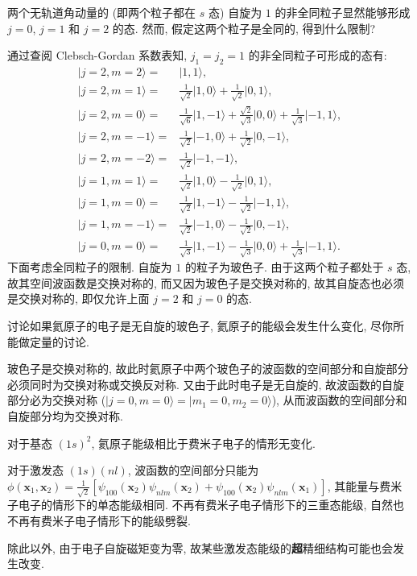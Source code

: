 \documentclass{assignment}
\begin{document}
\begin{prob}[课本习题 7.3]
    两个无轨道角动量的 (即两个粒子都在 $s$ 态) 自旋为 $1$ 的非全同粒子显然能够形成 $j=0$, $j=1$ 和 $j=2$ 的态. 然而, 假定这两个粒子是全同的, 得到什么限制?
\end{prob}
\begin{pf}
    通过查阅 Clebsch-Gordan 系数表知, $j_1=j_2=1$ 的非全同粒子可形成的态有:
    \begin{align}
        \lvert j=2,m=2\rangle=&\lvert 1,1\rangle,\\
        \lvert j=2,m=1\rangle=&\frac{1}{\sqrt{2}}\lvert 1,0\rangle+\frac{1}{\sqrt{2}}\lvert 0,1\rangle,\\
        \lvert j=2,m=0\rangle=&\frac{1}{\sqrt{6}}\lvert 1,-1\rangle+\frac{\sqrt{2}}{\sqrt{3}}\lvert 0,0\rangle+\frac{1}{\sqrt{3}}\lvert-1,1\rangle,\\
        \lvert j=2,m=-1\rangle=&\frac{1}{\sqrt{2}}\lvert-1,0\rangle+\frac{1}{\sqrt{2}}\lvert 0,-1\rangle,\\
        \lvert j=2,m=-2\rangle=&\frac{1}{\sqrt{2}}\lvert-1,-1\rangle,\\
        \lvert j=1,m=1\rangle=&\frac{1}{\sqrt{2}}\lvert 1,0\rangle-\frac{1}{\sqrt{2}}\lvert 0,1\rangle,\\
        \lvert j=1,m=0\rangle=&\frac{1}{\sqrt{2}}\lvert 1,-1\rangle-\frac{1}{\sqrt{2}}\lvert -1,1\rangle,\\
        \lvert j=1,m=-1\rangle=&\frac{1}{\sqrt{2}}\lvert-1,0\rangle-\frac{1}{\sqrt{2}}\lvert 0,-1\rangle,\\
        \lvert j=0,m=0\rangle=&\frac{1}{\sqrt{3}}\lvert 1,-1\rangle-\frac{1}{\sqrt{3}}\lvert 0,0\rangle+\frac{1}{\sqrt{3}}\lvert-1,1\rangle.
    \end{align}
    下面考虑全同粒子的限制. 自旋为 $1$ 的粒子为玻色子. 由于这两个粒子都处于 $s$ 态, 故其空间波函数是交换对称的, 而又因为玻色子是交换对称的, 故其自旋态也必须是交换对称的, 即仅允许上面 $j=2$ 和 $j=0$ 的态.
\end{pf}

\begin{prob}[课本习题 7.4]
    讨论如果氦原子的电子是无自旋的玻色子, 氦原子的能级会发生什么变化, 尽你所能做定量的讨论.
\end{prob}
\begin{sol}
    玻色子是交换对称的, 故此时氦原子中两个玻色子的波函数的空间部分和自旋部分必须同时为交换对称或交换反对称. 又由于此时电子是无自旋的, 故波函数的自旋部分必为交换对称 ($\lvert j=0,m=0\rangle=\lvert m_1=0,m_2=0\rangle$), 从而波函数的空间部分和自旋部分均为交换对称.

    对于基态 $(1s)^2$, 氦原子能级相比于费米子电子的情形无变化.

    对于激发态 $(1s)(nl)$, 波函数的空间部分只能为 $\phi(\bm{x}_1,\bm{x}_2)=\frac{1}{\sqrt{2}}[\psi_{100}(\bm{x}_2)\psi_{nlm}(\bm{x}_2)+\psi_{100}(\bm{x}_2)\psi_{nlm}(\bm{x}_1)]$, 其能量与费米子电子的情形下的单态能级相同. 不再有费米子电子情形下的三重态能级, 自然也不再有费米子电子情形下的能级劈裂.

    除此以外, 由于电子自旋磁矩变为零, 故某些激发态能级的\textbf{超}精细结构可能也会发生改变.
\end{sol}
\end{document}
